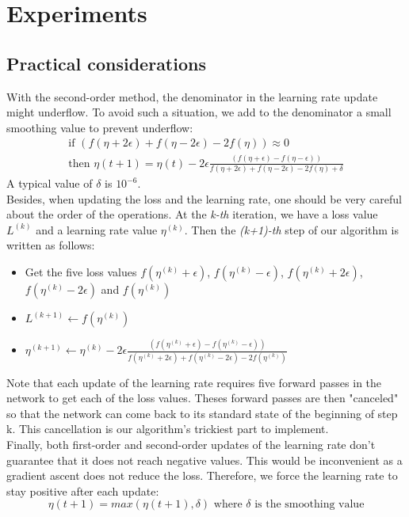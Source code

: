 \documentclass{article}
\begin{document}
  
  \section{Experiments}
  
  \subsection{Practical considerations}
  
  With the second-order method, the denominator in the learning rate update might underflow. To avoid such a situation, we add to the denominator a small smoothing value to prevent underflow:\\
  \begin{align}
  \text{if } (f(\eta+2\epsilon)+f(\eta-2\epsilon)-2f(\eta)) \approx 0\\
  \text{then }\eta(t+1) = \eta(t) - 2\epsilon\frac{(f(\eta+\epsilon)-f(\eta-\epsilon))}{f(\eta+2\epsilon)+f(\eta-2\epsilon)-2f(\eta)+\delta}
  \end{align}
  A typical value of $\delta$ is $10^{-6}$. \\
  
  Besides, when updating the loss and the learning rate, one should be very careful about the order of the operations. At the \emph{k-th} iteration, we have a loss value $L^{(k)}$ and a learning rate value $\eta^{(k)}$. Then the \emph{(k+1)-th} step of our algorithm is written as follows:\\
  \begin{itemize}
  	\item Get the five loss values $f(\eta^{(k)}+\epsilon)$, $f(\eta^{(k)}-\epsilon)$, $f(\eta^{(k)}+2\epsilon)$, $f(\eta^{(k)}-2\epsilon)$ and $f(\eta^{(k)})$
  	\item $L^{(k+1)} \leftarrow f(\eta^{(k)})$
  	\item $\eta^{(k+1)} \leftarrow \eta^{(k)} -2\epsilon\frac{(f(\eta^{(k)}+\epsilon)-f(\eta^{(k)}-\epsilon))}{f(\eta^{(k)}+2\epsilon)+f(\eta^{(k)}-2\epsilon)-2f(\eta^{(k)})}$
  \end{itemize}

  Note that each update of the learning rate requires five forward passes in the network to get each of the loss values. Theses forward passes are then "canceled" so that the network can come back to its standard state of the beginning of step k. This cancellation is our algorithm's trickiest part to implement.\\
  
  Finally, both first-order and second-order updates of the learning rate don't guarantee that it does not reach negative values. This would be inconvenient as a gradient ascent does not reduce the loss. Therefore, we force the learning  rate to stay positive after each update:\\
  \begin{equation}
  \eta(t+1) = max(\eta(t+1),\delta) \text{ where $\delta$ is the smoothing value}
  \end{equation}
  
\end{document}
